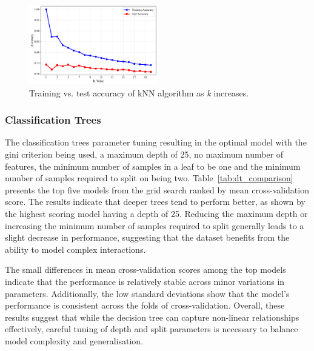 \documentclass[10pt, conference]{IEEEtran}
\begin{document}
\begin{figure}[htbp]
	\centering
	\includegraphics[width=0.5\textwidth]{../plots/knn_performance.pdf}
	\caption{Training vs. test accuracy of kNN algorithm as \textit{k} increases.}
	\label{fig:knn-perf}
\end{figure}


\subsubsection{Classification Trees}
The classification trees parameter tuning resulting in the optimal model with the gini criterion being used, a maximum depth of 25, no maximum number of features, the minimum number of samples in a leaf to be one and the minimum number of samples required to split on being two. Table~\ref{tab:dt_comparison} presents the top five models from the grid search ranked by mean cross-validation score. The results indicate that deeper trees tend to perform better, as shown by the highest scoring model having a depth of 25. Reducing the maximum depth or increasing the minimum number of samples required to split generally leads to a slight decrease in performance, suggesting that the dataset benefits from the ability to model complex interactions.

The small differences in mean cross-validation scores among the top models indicate that the performance is relatively stable across minor variations in parameters. Additionally, the low standard deviations show that the model’s performance is consistent across the folds of cross-validation. Overall, these results suggest that while the decision tree can capture non-linear relationships effectively, careful tuning of depth and split parameters is necessary to balance model complexity and generalisation.
\end{document}
